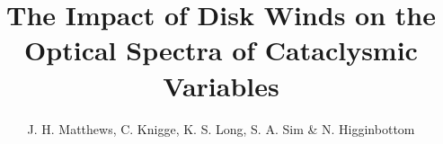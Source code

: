 \documentclass[preprint, a4paper, 11pt]{aastex}
\begin{document}

\renewcommand{\labelitemi}{$\bullet$}
\def\py{\textsc{Python} }
\def\tar{\textsc{Tardis} }
\def\cld{\textsc{Cloudy} }
\def\civ{C~\textsc{iv} }
\def\araa{ARAA}
\def\nat{Nature}
\def\apjl{ApJ Letters}
\def\aapr{AAPR}
\def\actaa{ACTAA} 
\def\ssr{SSR}
\def\apj{ApJ}
\def\apss{AP\&SS}
\def\pasp{PASP}
\def\aap{A\&A}
\def\mnras{MNRAS}
\def\aj{AJ}
\def\rmxaa{RMXAA}

\def\heiiopt{He~\textsc{ii}~$\lambda4686{\rm \AA}$}
\def\heiiuv{He~\textsc{ii}~$\lambda1640{\rm \AA}$}
\def\heiioptnew{He~\textsc{ii}~$\lambda3202{\rm \AA}$}
\def\la{Ly-$\alpha$}
\def\ha{H$\alpha$}
\def\hb{H$\beta$}
\def\civfull{C~\textsc{iv}~$\lambda1550{\rm \AA}$}

%
%


\title{The Impact of Disk Winds on the Optical Spectra of Cataclysmic Variables}
\author{J. H. Matthews, C. Knigge, K. S. Long, S. A. Sim \& N. Higginbottom}


%
%
\end{document}
